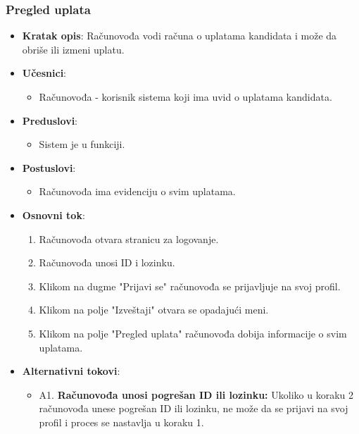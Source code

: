 \subsubsection{Pregled uplata}
\label{subsubsec:vozni park}
\begin{itemize}
  \item \textbf{Kratak opis}: Računovođa vodi računa o uplatama kandidata i može da obriše ili izmeni uplatu.

  \item \textbf{Učesnici}:
    \begin{itemize}
    \item Računovođa - korisnik sistema koji ima uvid o uplatama kandidata.
    \end{itemize}
  \item \textbf{Preduslovi}:
    \begin{itemize}
    \item  Sistem je u funkciji.
    \end{itemize}
  \item \textbf{Postuslovi}:
      \begin{itemize}
      \item  Računovođa ima evidenciju o svim uplatama.
      \end{itemize}
  \item \textbf{Osnovni tok}:
      \begin{enumerate}
        \item Računovođa otvara stranicu za logovanje.
        \item Računovođa unosi ID i lozinku.
        \item Klikom na dugme "Prijavi se" računovođa se prijavljuje na svoj profil.
        \item Klikom na polje "Izveštaji" otvara se opadajući meni.
        \item Klikom na polje "Pregled uplata" računovođa dobija informacije o svim uplatama.
      \end{enumerate}

  \item \textbf{Alternativni tokovi}:
      \begin{itemize}
        \item A1. \textbf{Računovođa unosi pogrešan ID ili lozinku:}
        Ukoliko u koraku 2 računovođa unese pogrešan ID ili lozinku, ne može da se prijavi na svoj profil i proces se nastavlja u koraku 1.
      \end{itemize}

\end{itemize}

